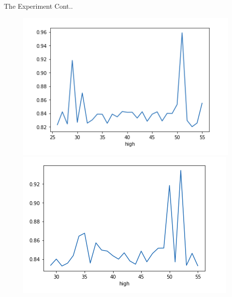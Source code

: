 \begin{frame}{The Experiment Cont..}
\begin{center}
    \end{center}
    \begin{center}
        \begin{figure}[h!]
              \includegraphics[width=0.8\linewidth]{CA3.PNG}
            \endminipage\hfill
              \includegraphics[width=0.8\linewidth]{CA4.PNG}
            \endminipage
        \end{figure}
    \end{center}
\end{frame}
